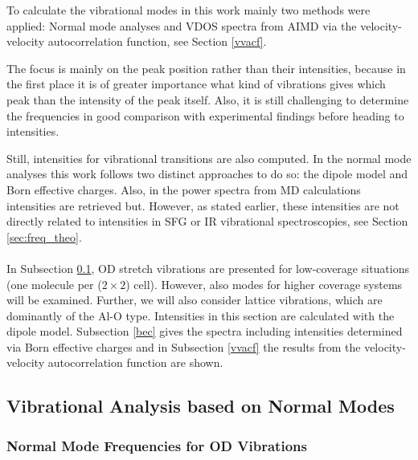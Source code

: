 \documentclass[11pt,DIV=13,BCOR=5mm,a4paper,headinclude]{scrbook}
\begin{document}
To calculate the vibrational modes in this work mainly two methods were applied: Normal mode analyses and VDOS spectra from AIMD via the velocity-velocity autocorrelation function, see Section \ref{vvacf}.


The focus is mainly on the peak position rather than their intensities, because in the first place it is of greater importance what kind of vibrations gives which peak than the intensity of the peak itself.
Also, it is still challenging to determine the frequencies in good comparison with experimental findings before heading to intensities.

Still, intensities for vibrational transitions are also computed.
In the normal mode analyses this work follows two distinct approaches to do so: the dipole model and Born effective charges.
Also, in the power spectra from MD calculations intensities are retrieved but.
However, as stated earlier, these intensities are not directly related to intensities in SFG or IR vibrational spectroscopies, see Section \ref{sec:freq_theo}.
\\\\

In Subsection \ref{nma}, OD stretch vibrations are presented for low-coverage situations (one molecule per ($2\times 2$) cell).
However, also modes for higher coverage systems will be examined.
Further, we will also consider lattice vibrations, which are dominantly of the Al-O type.
Intensities in this section are calculated with the dipole model.
Subsection \ref{bec} gives the spectra including intensities determined via Born effective charges and in Subsection \ref{vvacf} the results from the velocity-velocity autocorrelation function are shown.


\subsection{Vibrational Analysis based on Normal Modes}\label{nma}
\subsubsection{Normal Mode Frequencies for OD Vibrations}
\end{document}
